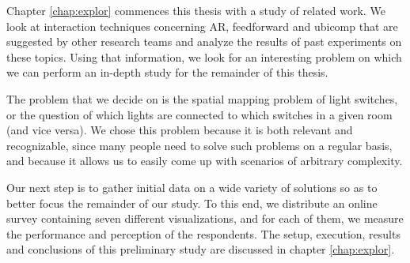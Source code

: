 
Chapter \ref{chap:explor} commences this thesis with a study of related work. We look at interaction techniques concerning AR, feedforward and ubicomp that are suggested by other research teams and analyze the results of past experiments on these topics. Using that information, we look for an interesting problem on which we can perform an in-depth study for the remainder of this thesis.

The problem that we decide on is the spatial mapping problem of light switches, or the question of which lights are connected to which switches in a given room (and vice versa). We chose this problem because it is both relevant and recognizable, since many people need to solve such problems on a regular basis, and because it allows us to easily come up with scenarios of arbitrary complexity.

Our next step is to gather initial data on a wide variety of solutions so as to better focus the remainder of our study. To this end, we distribute an online survey containing seven different visualizations, and for each of them, we measure the performance and perception of the respondents. The setup, execution, results and conclusions of this preliminary study are discussed in chapter \ref{chap:explor}.




